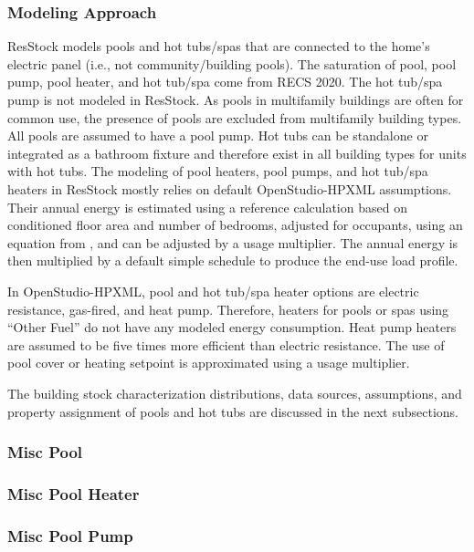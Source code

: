 \subsubsection{Modeling Approach}
ResStock models pools and hot tubs/spas that are connected to the home's electric panel (i.e., not community/building pools). The saturation of pool, pool pump, pool heater, and hot tub/spa come from RECS 2020. The hot tub/spa pump is not modeled in ResStock. As pools in multifamily buildings are often for common use, the presence of pools are excluded from multifamily building types. All pools are assumed to have a pool pump. Hot tubs can be standalone or integrated as a bathroom fixture and therefore exist in all building types for units with hot tubs. The modeling of pool heaters, pool pumps, and hot tub/spa heaters in ResStock mostly relies on default OpenStudio-HPXML assumptions. Their annual energy is estimated using a reference calculation based on conditioned floor area and number of bedrooms, adjusted for occupants, using an equation from \citet{bahsp_2010}, and can be adjusted by a usage multiplier. The annual energy is then multiplied by a default simple schedule to produce the end-use load profile.

In OpenStudio-HPXML, pool and hot tub/spa heater options are electric resistance, gas-fired, and heat pump. Therefore, heaters for pools or spas using ``Other Fuel'' do not have any modeled energy consumption. Heat pump heaters are assumed to be five times more efficient than electric resistance. The use of pool cover or heating setpoint is approximated using a usage multiplier.

The building stock characterization distributions, data sources, assumptions, and property assignment of pools and hot tubs are discussed in the next subsections.

\subsubsection{Misc Pool}


\subsubsection{Misc Pool Heater}


\subsubsection{Misc Pool Pump}


